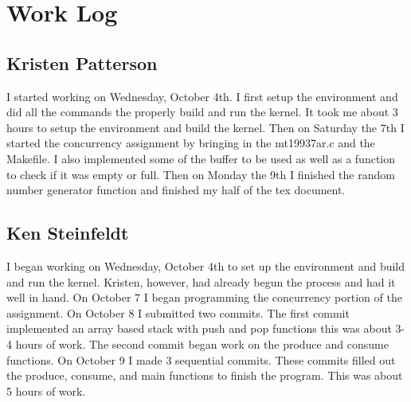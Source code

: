 \documentclass[10pt,letterpaper,onecolumn,draftclsnofoot]{IEEEtran}
\begin{document}
\section{Work Log}
\subsection{Kristen Patterson}
I started working on Wednesday, October 4th. I first setup the environment and 
did all the commands the properly build and run the kernel. It took me about 
3 hours to setup the environment and build the kernel. Then on Saturday the 7th
I started the concurrency assignment by bringing in the mt19937ar.c and the 
Makefile. I also implemented some of the buffer to be used as well as a 
function to check if it was empty or full. Then on Monday the 9th I finished 
the random number generator function and finished my half of the tex document.

\subsection{Ken Steinfeldt}
I began working on Wednesday, October 4th to set up the environment and build
and run the kernel. Kristen, however, had already begun the process and had it
well in hand. On October 7 I began programming the concurrency portion of the 
assignment. On October 8 I submitted two commits. The first commit implemented 
an array based stack with push and pop functions this was about 3-4 hours of 
work. The second commit began work on the produce and consume functions. On 
October 9 I made 3 sequential commits. These commits filled out the produce, 
consume, and main functions to finish the program. This was about 5 hours of work.
\end{document}
